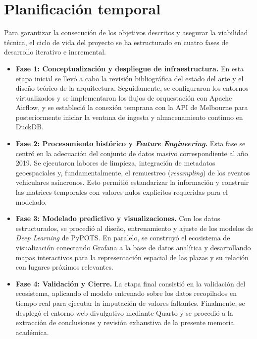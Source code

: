 \section{Planificación temporal}
\label{sec:planificacion}

Para garantizar la consecución de los objetivos descritos y asegurar la viabilidad técnica, el ciclo de vida del proyecto se ha estructurado en cuatro fases de desarrollo iterativo e incremental. 

\begin{itemize}
	\item \textbf{Fase 1: Conceptualización y despliegue de infraestructura.} En esta etapa inicial se llevó a cabo la revisión bibliográfica del estado del arte y el diseño teórico de la arquitectura. Seguidamente, se configuraron los entornos virtualizados y se implementaron los flujos de orquestación con Apache Airflow, y se estableció la conexión temprana con la API de Melbourne para posteriormente iniciar la ventana de ingesta y almacenamiento continuo en DuckDB.
	
	\item \textbf{Fase 2: Procesamiento histórico y \textit{Feature Engineering}.} Esta fase se centró en la adecuación del conjunto de datos masivo correspondiente al año 2019. Se ejecutaron labores de limpieza, integración de metadatos geoespaciales y, fundamentalmente, el remuestreo (\textit{resampling}) de los eventos vehiculares asíncronos. Esto permitió estandarizar la información y construir las matrices temporales con valores nulos explícitos requeridas para el modelado.
	
	\item \textbf{Fase 3: Modelado predictivo y visualizaciones.} Con los datos estructurados, se procedió al diseño, entrenamiento y ajuste de los modelos de \textit{Deep Learning} de PyPOTS. En paralelo, se construyó el ecosistema de visualización conectando Grafana a la base de datos analítica y desarrollando mapas interactivos para la representación espacial de las plazas y su relación con lugares próximos relevantes.
	
	\item \textbf{Fase 4: Validación y Cierre.} La etapa final consistió en la validación del ecosistema, aplicando el modelo entrenado sobre los datos recopilados en tiempo real para ejecutar la imputación de valores faltantes. Finalmente, se desplegó el entorno web divulgativo mediante Quarto y se procedió a la extracción de conclusiones y revisión exhaustiva de la presente memoria académica.
\end{itemize}

